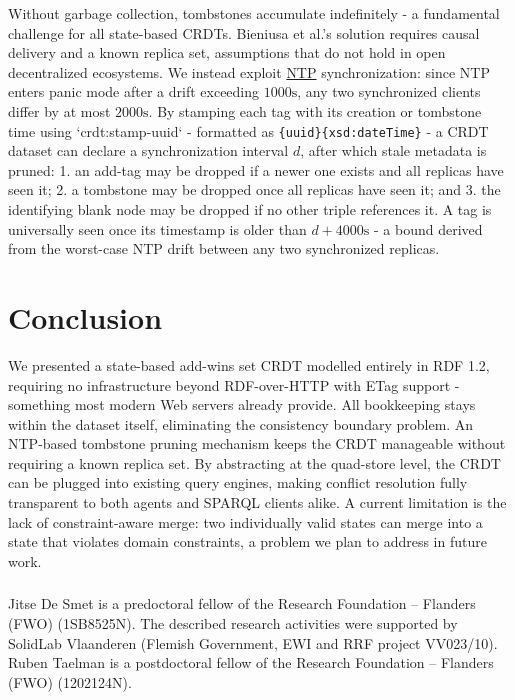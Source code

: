 \documentclass[runningheads]{llncs}
\begin{document}
    Without garbage collection, tombstones accumulate indefinitely -
    a fundamental challenge for all state-based CRDTs.
    Bieniusa et al.'s solution requires causal delivery and a known replica set,
    assumptions that do not hold in open decentralized ecosystems.
    We instead exploit  \href{https://www.rfc-editor.org/rfc/rfc5905}{NTP} synchronization:
    since NTP enters panic mode after a drift exceeding \(1000\text{s}\),
    any two synchronized clients differ by at most \(2000\text{s}\).
    By stamping each tag with its creation or tombstone time using `crdt:stamp-uuid` -
    formatted as \texttt{\{uuid\}\{xsd:dateTime\}} -
    a CRDT dataset can declare a synchronization interval \(d\), after which stale metadata is pruned:
    1. an add-tag may be dropped if a newer one exists and all replicas have seen it;
    2. a tombstone may be dropped once all replicas have seen it; and
    3. the identifying blank node may be dropped if no other triple references it.
    A tag is universally seen once its timestamp is older than \(d + 4000\text{s}\) -
    a bound derived from the worst-case NTP drift between any two synchronized replicas.


    \section{Conclusion}
    \label{conclusion}

    We presented a state-based add-wins set CRDT modelled entirely in RDF 1.2,
    requiring no infrastructure beyond RDF-over-HTTP with ETag support - something most modern Web servers already provide.
    All bookkeeping stays within the dataset itself, eliminating the consistency boundary problem.
    An NTP-based tombstone pruning mechanism keeps the CRDT manageable without requiring a known replica set.
    By abstracting at the quad-store level, the CRDT can be plugged into existing query engines,
    making conflict resolution fully transparent to both agents and SPARQL clients alike.
    A current limitation is the lack of constraint-aware merge:
    two individually valid states can merge into a state that violates domain constraints,
    a problem we plan to address in future work.

    \begin{credits}
        \subsubsection{\ackname}
        Jitse De Smet is a predoctoral fellow of the Research Foundation -- Flanders (FWO) (1SB8525N).
        The described research activities were supported by SolidLab Vlaanderen (Flemish Government, EWI and RRF project VV023/10).
        Ruben Taelman is a postdoctoral fellow of the Research Foundation -- Flanders (FWO) (1202124N).
    \end{credits}

%
%
%
    
    
\end{document}
